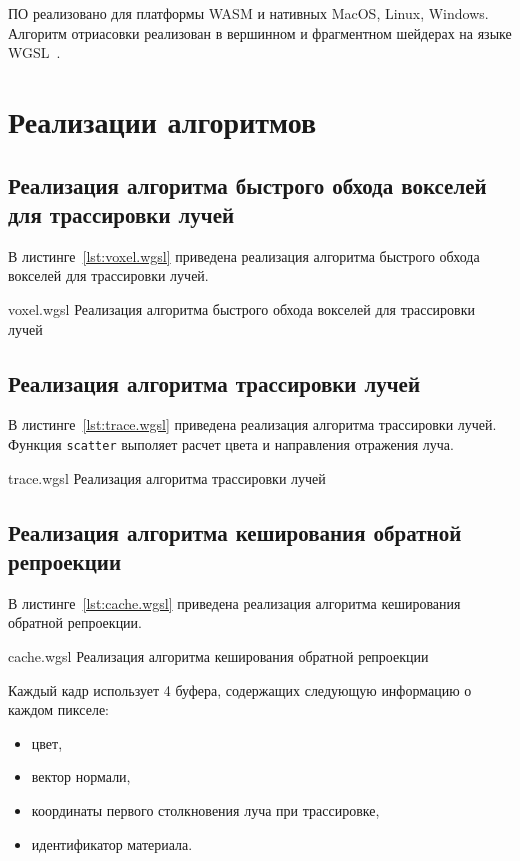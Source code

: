 ПО реализовано для платформы WASM и нативных MacOS, Linux, Windows. 
Алгоритм отриасовки реализован в вершинном и фрагментном шейдерах на языке WGSL~\cite{WebGPUSL}.

\section{Реализации алгоритмов}

\subsection{Реализация алгоритма быстрого обхода вокселей для трассировки лучей}

В листинге~\ref{lst:voxel.wgsl} приведена реализация алгоритма быстрого 
обхода вокселей для трассировки лучей.

\pagebreak

    {voxel.wgsl}
    {Реализация алгоритма быстрого обхода вокселей для трассировки лучей}

\subsection{Реализация алгоритма трассировки лучей}

В листинге~\ref{lst:trace.wgsl} приведена реализация алгоритма трассировки лучей.
Функция \verb|scatter| выполяет расчет цвета и направления отражения луча.

    {trace.wgsl}
    {Реализация алгоритма трассировки лучей}

\subsection{Реализация алгоритма кеширования обратной репроекции}

В листинге~\ref{lst:cache.wgsl} приведена реализация алгоритма кеширования обратной репроекции.

    {cache.wgsl}
    {Реализация алгоритма кеширования обратной репроекции}

Каждый кадр использует 4 буфера, содержащих следующую информацию о каждом пикселе:
\begin{itemize}
    \item цвет,
    \item вектор нормали,
    \item координаты первого столкновения луча при трассировке,
    \item идентификатор материала.
\end{itemize}

